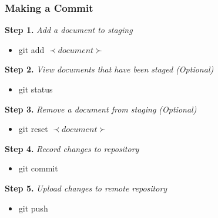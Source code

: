 \documentclass{beamer}
\begin{document}
\begin{frame}
	\frametitle{\textbf{Making a Commit}}

	\textbf{Step 1.} \textit{Add a document to staging}
	\begin{itemize}
		\item git add \(\prec document \succ\)
	\end{itemize}

	
	\vspace{0.5cm}

	\textbf{Step 2.} \textit{View documents that have been staged (Optional)}
	\begin{itemize}
		\item git status
	\end{itemize}

	
	\vspace{0.5cm}

	\textbf{Step 3.} \textit{Remove a document from staging (Optional)}
	\begin{itemize}
		\item git reset \(\prec document \succ\)
	\end{itemize}


	\vspace{0.5cm}

	\textbf{Step 4.} \textit{Record changes to repository}
	\begin{itemize}
		\item git commit
	\end{itemize}


	\vspace{0.5cm}

	\textbf{Step 5.} \textit{Upload changes to remote repository}
	\begin{itemize}
		\item git push 
	\end{itemize}
\end{frame}
\end{document}
